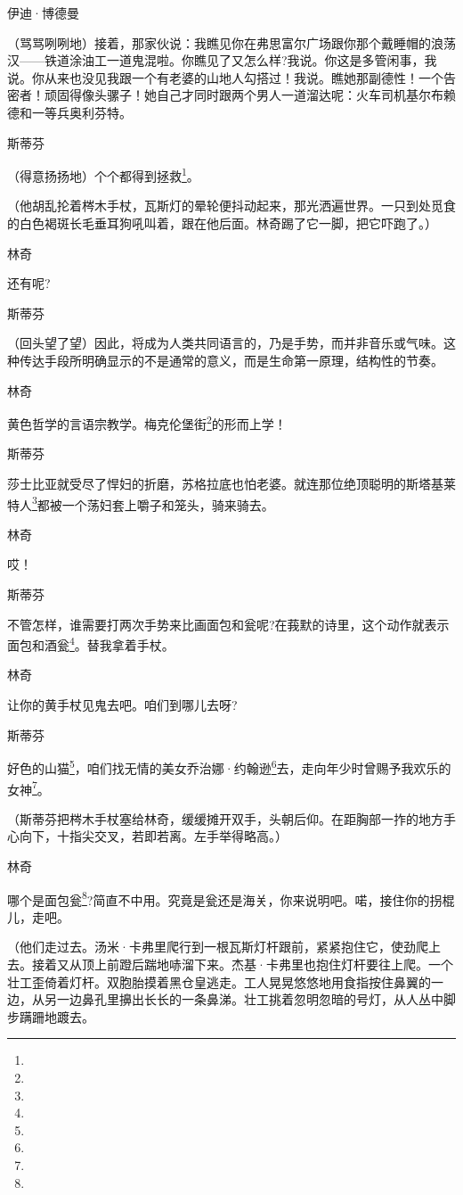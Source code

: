 \par 伊迪·博德曼
\par （骂骂咧咧地）接着，那家伙说：我瞧见你在弗思富尔广场跟你那个戴睡帽的浪荡汉——铁道涂油工一道鬼混啦。你瞧见了又怎么样?我说。你这是多管闲事，我说。你从来也没见我跟一个有老婆的山地人勾搭过！我说。瞧她那副德性！一个告密者！顽固得像头骡子！她自己才同时跟两个男人一道溜达呢：火车司机基尔布赖德和一等兵奥利芬特。
\par 斯蒂芬
\par （得意扬扬地）个个都得到拯救\footnote{}。
\par （他胡乱抡着梣木手杖，瓦斯灯的晕轮便抖动起来，那光洒遍世界。一只到处觅食的白色褐斑长毛垂耳狗吼叫着，跟在他后面。林奇踢了它一脚，把它吓跑了。）
\par 林奇
\par 还有呢?
\par 斯蒂芬
\par （回头望了望）因此，将成为人类共同语言的，乃是手势，而并非音乐或气味。这种传达手段所明确显示的不是通常的意义，而是生命第一原理，结构性的节奏。
\par 林奇
\par 黄色哲学的言语宗教学。梅克伦堡街\footnote{}的形而上学！
\par 斯蒂芬
\par 莎士比亚就受尽了悍妇的折磨，苏格拉底也怕老婆。就连那位绝顶聪明的斯塔基莱特人\footnote{}都被一个荡妇套上嚼子和笼头，骑来骑去。
\par 林奇
\par 哎！
\par 斯蒂芬
\par 不管怎样，谁需要打两次手势来比画面包和瓮呢?在莪默的诗里，这个动作就表示面包和酒瓮\footnote{}。替我拿着手杖。
\par 林奇
\par 让你的黄手杖见鬼去吧。咱们到哪儿去呀?
\par 斯蒂芬
\par 好色的山猫\footnote{}，咱们找无情的美女乔治娜·约翰逊\footnote{}去，走向年少时曾赐予我欢乐的女神\footnote{}。
\par （斯蒂芬把梣木手杖塞给林奇，缓缓摊开双手，头朝后仰。在距胸部一拃的地方手心向下，十指尖交叉，若即若离。左手举得略高。）
\par 林奇
\par 哪个是面包瓮\footnote{}?简直不中用。究竟是瓮还是海关，你来说明吧。喏，接住你的拐棍儿，走吧。
\par （他们走过去。汤米·卡弗里爬行到一根瓦斯灯杆跟前，紧紧抱住它，使劲爬上去。接着又从顶上前蹬后踹地哧溜下来。杰基·卡弗里也抱住灯杆要往上爬。一个壮工歪倚着灯杆。双胞胎摸着黑仓皇逃走。工人晃晃悠悠地用食指按住鼻翼的一边，从另一边鼻孔里擤出长长的一条鼻涕。壮工挑着忽明忽暗的号灯，从人丛中脚步蹒跚地踱去。
